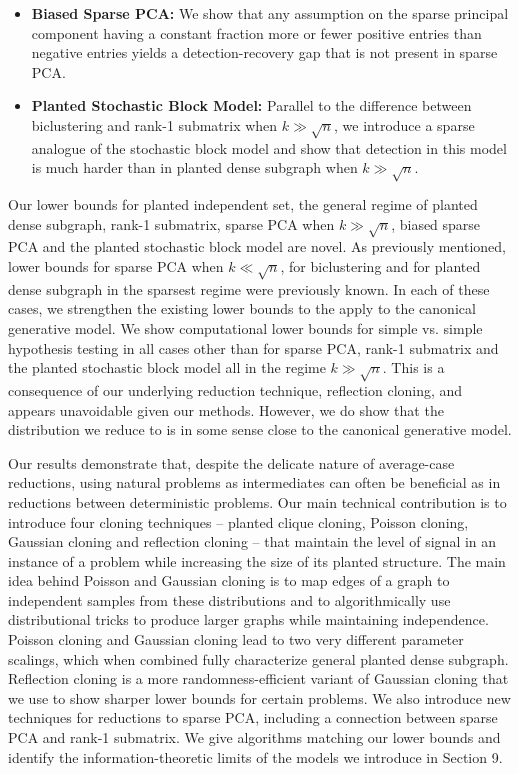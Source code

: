 \documentclass[11pt]{article}
\begin{document}
\begin{itemize}
\item \textbf{Biased Sparse PCA:} We show that any assumption on the sparse principal component having a constant fraction more or fewer positive entries than negative entries yields a detection-recovery gap that is not present in sparse PCA. 
\item \textbf{Planted Stochastic Block Model:} Parallel to the difference between biclustering and rank-1 submatrix when $k \gg \sqrt{n}$, we introduce a sparse analogue of the stochastic block model and show that detection in this model is much harder than in planted dense subgraph when $k \gg \sqrt{n}$.
\end{itemize}
Our lower bounds for planted independent set, the general regime of planted dense subgraph, rank-1 submatrix, sparse PCA when $k \gg \sqrt{n}$, biased sparse PCA and the planted stochastic block model are novel. As previously mentioned, lower bounds for sparse PCA when $k \ll \sqrt{n}$, for biclustering and for planted dense subgraph in the sparsest regime were previously known. In each of these cases, we strengthen the existing lower bounds to the apply to the canonical generative model. We show computational lower bounds for simple vs. simple hypothesis testing in all cases other than for sparse PCA, rank-1 submatrix and the planted stochastic block model all in the regime $k \gg \sqrt{n}$. This is a consequence of our underlying reduction technique, reflection cloning, and appears unavoidable given our methods. However, we do show that the distribution we reduce to is in some sense close to the canonical generative model.

Our results demonstrate that, despite the delicate nature of average-case reductions, using natural problems as intermediates can often be beneficial as in reductions between deterministic problems. Our main technical contribution is to introduce four cloning techniques -- planted clique cloning, Poisson cloning, Gaussian cloning and reflection cloning -- that maintain the level of signal in an instance of a problem while increasing the size of its planted structure. The main idea behind Poisson and Gaussian cloning is to map edges of a graph to independent samples from these distributions and to algorithmically use distributional tricks to produce larger graphs while maintaining independence. Poisson cloning and Gaussian cloning lead to two very different parameter scalings, which when combined fully characterize general planted dense subgraph. Reflection cloning is a more randomness-efficient variant of Gaussian cloning that we use to show sharper lower bounds for certain problems. We also introduce new techniques for reductions to sparse PCA, including a connection between sparse PCA and rank-1 submatrix. We give algorithms matching our lower bounds and identify the information-theoretic limits of the models we introduce in Section 9.
\end{document}
